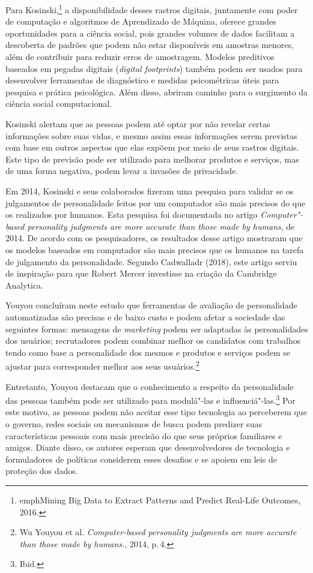 Para Kosinski,\footnote{emph{Mining Big Data to Extract Patterns and Predict Real-Life
Outcomes}, 2016.} a disponibilidade desses rastros digitais,
juntamente com poder de computação e algoritmos de Aprendizado de
Máquina, oferece grandes oportunidades para a ciência social, pois
grandes volumes de dados facilitam a descoberta de padrões que podem não
estar disponíveis em amostras menores, além de contribuir para reduzir
erros de amostragem. Modelos preditivos baseados em pegadas digitais
(\emph{digital footprints}) também podem ser usados para desenvolver
ferramentas de diagnóstico e medidas psicométricas úteis para pesquisa e
prática psicológica. Além disso, abriram caminho para o surgimento da
ciência social computacional.

Kosinski alertam que as pessoas podem até optar por não
revelar certas informações sobre suas vidas, e mesmo assim essas
informações serem previstas com base em outros aspectos que elas expõem
por meio de seus rastros digitais. Este tipo de previsão pode ser
utilizado para melhorar produtos e serviços, mas de uma forma negativa,
podem levar a invasões de privacidade.

Em 2014, Kosinski e seus colaborados fizeram uma pesquisa para validar
se os julgamentos de personalidade feitos por um computador são mais
precisos do que os realizados por humanos. Esta pesquisa foi documentada
no artigo \emph{Computer"-based personality judgments are more accurate
than those made by humans}, de 2014. De acordo com os
pesquisadores, os resultados desse artigo mostraram que os modelos
baseados em computador são mais precisos que os humanos na tarefa de
julgamento da personalidade. Segundo Cadwalladr (2018), este artigo
serviu de inspiração para que Robert Mercer investisse na criação da
Cambridge Analytica.

Youyou concluíram neste estudo que ferramentas de avaliação
de personalidade automatizadas são precisas e de baixo custo e podem
afetar a sociedade das seguintes formas: mensagens de \emph{marketing} podem
ser adaptadas às personalidades dos usuários; recrutadores podem
combinar melhor os candidatos com trabalhos tendo como base a
personalidade dos mesmos e produtos e serviços podem se ajustar para
corresponder melhor aos seus usuários.\footnote{Wu Youyou et al. \emph{Computer-based personality judgments are more accurate than
those made by humans.}, 2014, p.\,4.}

Entretanto, Youyou destacam que o conhecimento a respeito
da personalidade das pessoas também pode ser utilizado para modulá"-las e
influenciá"-las.\footnote{Ibid.} Por este motivo, as pessoas podem não aceitar esse tipo
tecnologia ao perceberem que o governo, redes sociais ou mecanismos de
busca podem predizer suas características pessoais com mais precisão do
que seus próprios familiares e amigos. Diante disso, os autores esperam
que desenvolvedores de tecnologia e formuladores de políticas considerem
esses desafios e se apoiem em leis de proteção dos dados.

